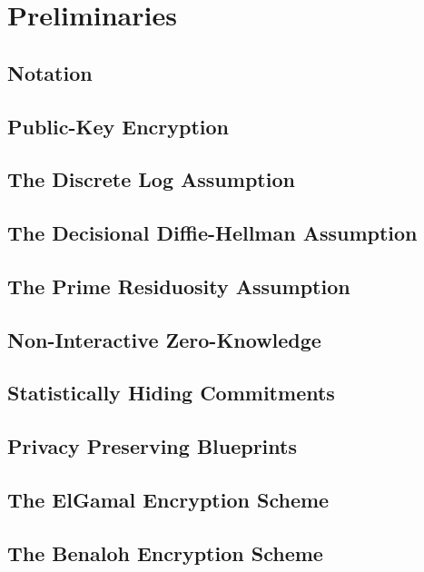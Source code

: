 \chapter{Preliminaries}
\label{chap:prelims}

\section{Notation}


\section{Public-Key Encryption}


\section{The Discrete Log Assumption}


\section{The Decisional Diffie-Hellman Assumption}


\section{The Prime Residuosity Assumption}


\section{Non-Interactive Zero-Knowledge}


\section{Statistically Hiding Commitments}


\section{Privacy Preserving Blueprints}


\section{The ElGamal Encryption Scheme}


\section{The Benaloh Encryption Scheme}
\label{sec:benaloh_scheme}

